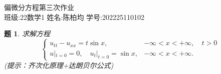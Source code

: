 \documentclass[12pt,a4paper]{article}
\newtheorem{problem}{题}
\begin{document}
	
	\begin{center}
		\LARGE 偏微分方程第三次作业 \\
		\vspace{0.5cm}
		\large 班级:22数学1 \quad 姓名:陈柏均 \quad 学号:202225110102
	\end{center}
	




\begin{problem}
	求解方程
	\[
	\begin{cases}
		u_{tt} - u_{xx} = t\sin x, & -\infty < x < +\infty, \quad t > 0 \\
		u|_{t=0} = 0, \quad u_t|_{t=0} = \sin x, & -\infty < x < +\infty.
	\end{cases}
	\]
	(提示：齐次化原理+达朗贝尔公式)
	
\end{problem}
\end{document}
